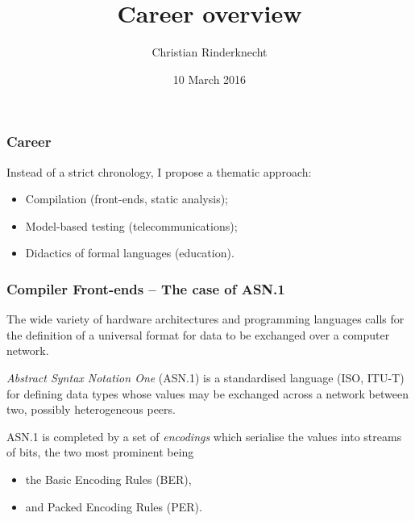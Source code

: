 \documentclass[compress,dvips,xcolor={dvipsnames},t]{beamer}
\title{Career overview}
\author{Christian Rinderknecht}
\date{10 March 2016}
\newcommand\ASN{\textsf{ASN.1}\xspace}
\begin{document}
\frame{\maketitle}

\begin{frame}
  \frametitle{Career}

  Instead of a strict chronology, I propose a thematic approach:
  \begin{itemize}
    \item Compilation (front-ends, static analysis);
    \item Model-based testing (telecommunications);
    \item Didactics of formal languages (education).
  \end{itemize}

\end{frame}

\begin{frame}
\frametitle{Compiler Front-ends -- The case of \ASN}

The wide variety of hardware architectures and programming languages
calls for the definition of a universal format for data to be
exchanged over a computer network.

\medskip

\emph{Abstract Syntax Notation One} (\ASN) is a standardised language
(ISO, ITU-T) for defining data types whose values may be exchanged
across a network between two, possibly heterogeneous peers.

\medskip

\ASN is completed by a set of \emph{encodings} which serialise the
values into streams of bits, the two most prominent being
\begin{itemize}

  \item the Basic Encoding Rules (BER),

  \item and Packed Encoding Rules (PER).

\end{itemize}

\end{frame}
\end{document}

